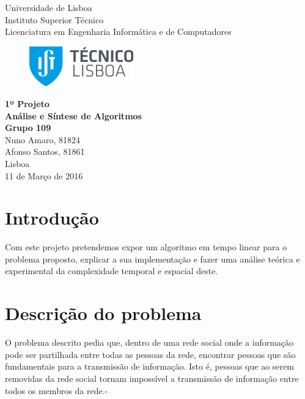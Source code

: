 \documentclass{scrartcl}
\begin{document}

\begin{titlepage}
	\begin{center}
		{\large Universidade de Lisboa}\\[0.4cm]
		{\large Instituto Superior Técnico}\\[0.4cm]
		{\large Licenciatura em Engenharia Informática e de Computadores}\\[1.5cm]
		\begin{figure}[!htb]
			\centering
			\includegraphics[width=0.4\textwidth]{ist.png} \\[2cm]
		\end{figure}
		{\bf \huge 1º Projeto}\\[2.0cm]
		{\bf \Large Análise e Síntese de Algoritmos}\\[2.2cm]
		{\bf \Large Grupo 109}\\[0.6cm]
		{\large Nuno Amaro, 81824}\\[0.4cm]
		{\large Afonso Santos, 81861}\\[2.2cm]
		{\large Lisboa}\\[0.4cm]
		{\large 11 de Março de 2016}
	\end{center}
\end{titlepage}

\section*{Introdução}
Com este projeto pretendemos expor um algoritmo em tempo linear para o problema proposto, explicar a sua implementação e fazer uma análise teórica e experimental da complexidade temporal e espacial deste.

\section*{Descrição do problema}
O problema descrito pedia que, dentro de uma rede social onde a informação pode ser partilhada entre todas as pessoas da rede, encontrar pessoas que são fundamentais para a transmissão de informação. Isto é, pessoas que ao serem removidas da rede social tornam impossível a transmissão de informação entre todos os membros da rede.-
\end{document}

